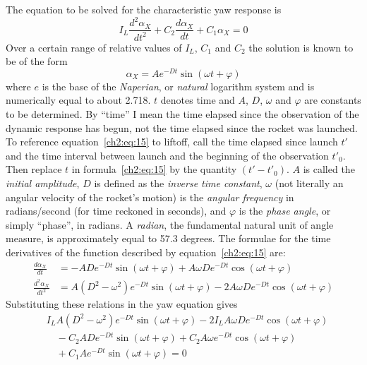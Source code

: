 The equation to be solved for the characteristic yaw response is
\begin{equation*}
I_L \frac{d^{2}\alpha_X}{dt^{2}} + C_2 \frac{d\alpha_X}{dt} + C_1\alpha_X = 0
\end{equation*}
Over a certain range of relative values of $I_L$, $C_1$ and $C_2$ the solution
is known to be of the form
\begin{equation}\label{ch2:eq:15}
\alpha_X = A e^{-Dt}\sin(\omega t + \varphi)
\end{equation}
where $e$ is the base of the \emph{Naperian}, or \emph{natural} logarithm
system and is numerically equal to about 2.718. $t$ denotes time and $A$, $D$,
$\omega$ and $\varphi$ are constants to be determined. By ``time'' I mean the
time elapsed since the observation of the dynamic response has begun, not the
time elapsed since the rocket was launched. To reference
equation~\eqref{ch2:eq:15} to liftoff, call the time elapsed since launch $t'$
and the time interval between launch and the beginning of the observation
$t'_0$. Then replace $t$ in formula~\eqref{ch2:eq:15} by the quantity
$(t' - t'_0)$. $A$ is called the \emph{initial amplitude}, $D$ is defined as
the \emph{inverse time constant}, $\omega$ (not literally an angular velocity
of the rocket's motion) is the \emph{angular frequency} in radians/second (for
time reckoned in seconds), and $\varphi$ is the \emph{phase angle}, or simply
``phase'', in radians. A \emph{radian}, the fundamental natural unit of angle
measure, is approximately equal to 57.3 degrees. The formulae for the time
derivatives of the function described by equation~\eqref{ch2:eq:15}
are:
\begin{align*}
\frac{d\alpha_X}{dt} &= -AD e^{-Dt}\sin(\omega t + \varphi)
  + A\omega D e^{-Dt}\cos(\omega t + \varphi)\\
\frac{d^{2}\alpha_X}{dt^{2}} &= A(D^{2} - \omega^{2}) e^{-Dt}\sin(\omega t + \varphi)
  - 2A\omega D e^{-Dt}\cos(\omega t + \varphi)
\end{align*}
Substituting these relations in the yaw equation gives
\begin{align*}
&I_L A(D^{2} - \omega^{2}) e^{-Dt}\sin(\omega t + \varphi)
  - 2 I_L A\omega D e^{-Dt}\cos(\omega t + \varphi)\\
&\quad - C_2 A D e^{-Dt}\sin(\omega t + \varphi)
  + C_2 A\omega e^{-Dt}\cos(\omega t + \varphi)\\
&\quad + C_1 A e^{-Dt}\sin(\omega t + \varphi) = 0
\end{align*}
